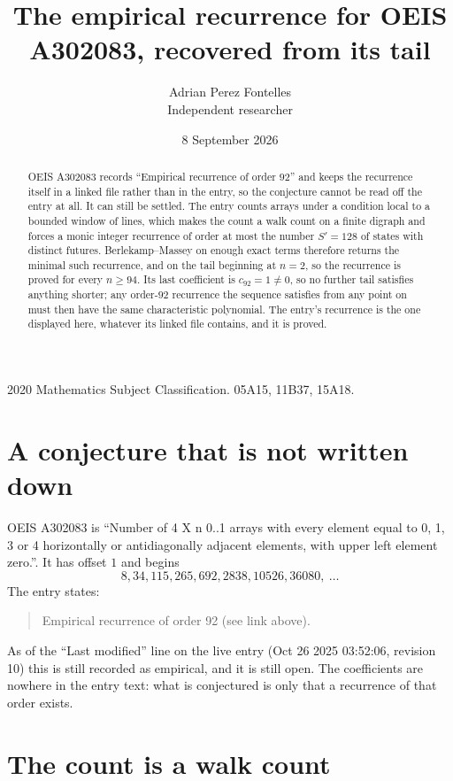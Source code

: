 \documentclass[11pt,a4paper]{article}
\title{The empirical recurrence for OEIS A302083, recovered from its tail}
\author{Adrian Perez Fontelles\\ \small Independent researcher}
\date{8 September 2026}
\theoremstyle{plain}
\theoremstyle{definition}
\begin{document}
\maketitle

\begin{abstract}
OEIS A302083 records ``Empirical recurrence of order $92$'' and keeps the recurrence itself in
a linked file rather than in the entry, so the conjecture cannot be read off the entry at all.
It can still be settled. The entry counts arrays under a condition local to a bounded window of
lines, which makes the count a walk count on a finite digraph and forces a monic integer
recurrence of order at most the number $S'=128$ of states with distinct futures. Berlekamp--Massey on
enough exact terms therefore returns the minimal such recurrence, and on the tail beginning at $n=2$, so the recurrence is proved for every $n\ge94$.
Its last coefficient is $c_{92}=1\neq0$, so no further tail satisfies anything
shorter; any order-$92$ recurrence the sequence satisfies from any point on must then have
the same characteristic polynomial. The entry's recurrence is the one displayed here, whatever
its linked file contains, and it is proved.
\end{abstract}

\noindent\small 2020 Mathematics Subject Classification. 05A15, 11B37, 15A18.\normalsize

\section{A conjecture that is not written down}

OEIS A302083 is ``Number of 4 X n 0..1 arrays with every element equal to 0, 1, 3 or 4 horizontally or antidiagonally adjacent elements, with upper left element zero.''. It has offset $1$ and begins
\[
8, 34, 115, 265, 692, 2838, 10526, 36080,\ \dots
\]
The entry states:
\begin{quote}
Empirical recurrence of order 92 (see link above).
\end{quote}
As of the ``Last modified'' line on the live entry (Oct 26 2025 03:52:06, revision 10)
this is still recorded as empirical, and it is still open. The coefficients are nowhere in the
entry text: what is conjectured is only that a recurrence of that order exists.

\section{The count is a walk count}
\end{document}
